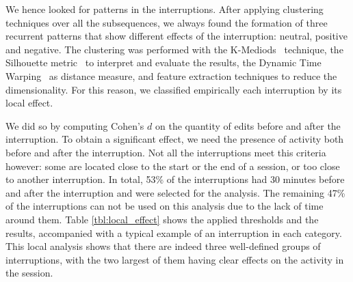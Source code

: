 \documentclass[times]{smrauth}
\begin{document}
We hence looked for patterns in the interruptions.  After applying clustering techniques over all the subsequences, we always found the formation of three recurrent patterns that show different effects of the interruption: neutral, positive and negative. The clustering was performed with the  K-Mediods~\cite{AMP97} technique, the Silhouette metric~\cite{RP87} to interpret and evaluate the results, the Dynamic Time Warping~\cite{KE05} as distance measure, and feature extraction techniques to reduce the dimensionality.  For this reason, we classified empirically each interruption by its local effect. 

We did so by computing Cohen's $d$ on the quantity of edits before and after the interruption. To obtain a significant effect, we need the presence of activity both before and after the interruption. Not all the interruptions meet this criteria however: some are located close to the start or the end of a session, or too close to another interruption.  In total, 53\% of the interruptions had 30 minutes before and after the interruption and were selected for the analysis.  The remaining 47\% of the interruptions can not be used on this analysis due to the lack of time around them. %
Table \ref{tbl:local_effect} shows the applied thresholds and the results, accompanied with a typical example of an interruption in each category. This local analysis shows that there are indeed three well-defined groups of interruptions, with the two largest of them having clear effects on the activity in the session.



\end{document}
